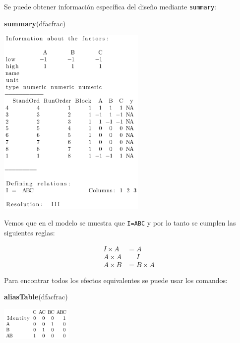 \documentclass[
]{book}
\newenvironment{Shaded}{\begin{snugshade}}{\end{snugshade}}
\newcommand{\FunctionTok}[1]{\textcolor[rgb]{0.13,0.29,0.53}{\textbf{#1}}}
\newcommand{\NormalTok}[1]{#1}
\begin{document}
Se puede obtener información específica del diseño mediante \texttt{summary}:

\begin{Shaded}
\begin{Highlighting}[]
\FunctionTok{summary}\NormalTok{(dfacfrac)}
\end{Highlighting}
\end{Shaded}

\includegraphics[width=2.8125in,height=\textheight]{graficos/fracdfac.png}

Vemos que en el modelo se muestra que \texttt{I=ABC} y por lo tanto se cumplen las siguientes reglas:

\begin{align}
I\times A&=A\\
A\times A&=I\\
A\times B&=B\times A
\end{align}

Para encontrar todos los efectos equivalentes se puede usar los comandos:

\begin{Shaded}
\begin{Highlighting}[]
\FunctionTok{aliasTable}\NormalTok{(dfacfrac)}
\end{Highlighting}
\end{Shaded}

\includegraphics[width=1.35417in,height=\textheight]{graficos/aliastabledf.png}
\end{document}
